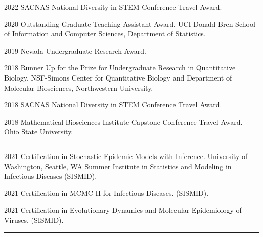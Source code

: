 \documentclass{article}
\begin{document}


\begin{description}
	\vspace{-2mm}
	\item[Awards]\hspace*{.1in}
	
		2022 SACNAS National Diversity in STEM Conference Travel Award.
		\vspace*{1mm}
	
		2020 Outstanding Graduate Teaching Assistant Award. UCI Donald Bren School of Information and Computer Sciences, Department of Statistics.
		\vspace*{1mm}
		
		2019 Nevada Undergraduate Research Award.
		\vspace*{1mm}
		
		2018 Runner Up for the Prize for Undergraduate Research in Quantitative Biology. NSF-Simons Center for Quantitative Biology and Department of Molecular Biosciences, Northwestern University.
		\vspace*{1mm}
		
		2018 SACNAS National Diversity in STEM Conference Travel Award.
		\vspace*{1mm}
		
		2018 Mathematical Biosciences Institute Capstone Conference Travel Award. Ohio State University.
	
\end{description}
\vspace{-2mm}
\rule{\linewidth}{1pt}




\begin{description}
	\vspace{-2mm}
	\item[Certifications]\hspace*{.01in}
	
		2021 Certification in Stochastic Epidemic Models with Inference. University of Washington, Seattle, WA Summer Institute in Statistics and Modeling in Infectious Diseases (SISMID).
		\vspace*{1mm}
		
		2021 Certification in MCMC II for Infectious Diseases. (SISMID).
		\vspace*{1mm}
		
		2021 Certification in Evolutionary Dynamics and Molecular Epidemiology of Viruses. (SISMID).
	
\end{description}
\vspace{-2mm}
\rule{\linewidth}{1pt}
\end{document}
